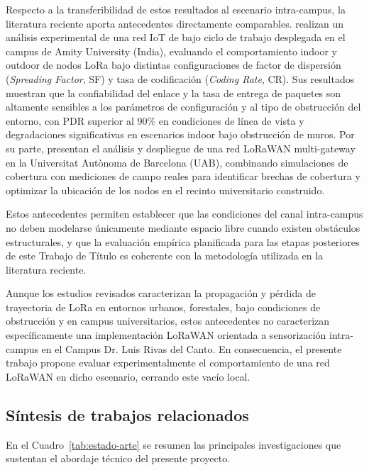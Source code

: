 \documentclass[12pt,oneside,openany,spanish,oldfontcommands]{memoir}
\begin{document}
Respecto a la transferibilidad de estos resultados al escenario intra-campus, la literatura
reciente aporta antecedentes directamente comparables. \textcite{kaur2024campus} realizan
un análisis experimental de una red IoT de bajo ciclo de trabajo desplegada en el campus
de Amity University (India), evaluando el comportamiento indoor y outdoor de nodos LoRa
bajo distintas configuraciones de factor de dispersión (\textit{Spreading Factor}, SF) y
tasa de codificación (\textit{Coding Rate}, CR). Sus resultados muestran que la
confiabilidad del enlace y la tasa de entrega de paquetes son altamente sensibles a los
parámetros de configuración y al tipo de obstrucción del entorno, con PDR superior al
90\% en condiciones de línea de vista y degradaciones significativas en escenarios indoor
bajo obstrucción de muros. Por su parte, \textcite{barrachina2023campus} presentan el
análisis y despliegue de una red LoRaWAN multi-gateway en la Universitat Autònoma de
Barcelona (UAB), combinando simulaciones de cobertura con mediciones de campo reales para
identificar brechas de cobertura y optimizar la ubicación de los nodos en el recinto
universitario construido.

Estos antecedentes permiten establecer que las condiciones del canal intra-campus no
deben modelarse únicamente mediante espacio libre cuando existen obstáculos estructurales,
y que la evaluación empírica planificada para las etapas posteriores de este Trabajo de
Título es coherente con la metodología utilizada en la literatura reciente.

Aunque los estudios revisados caracterizan la propagación y pérdida de trayectoria de LoRa
en entornos urbanos, forestales, bajo condiciones de obstrucción y en campus universitarios,
estos antecedentes no caracterizan específicamente una implementación LoRaWAN orientada a
sensorización intra-campus en el Campus Dr. Luis Rivas del Canto. En consecuencia, el
presente trabajo propone evaluar experimentalmente el comportamiento de una red LoRaWAN en
dicho escenario, cerrando este vacío local.

\subsection{Síntesis de trabajos relacionados}

En el Cuadro~\ref{tab:estado-arte} se resumen las principales investigaciones que
sustentan el abordaje técnico del presente proyecto.
\end{document}
